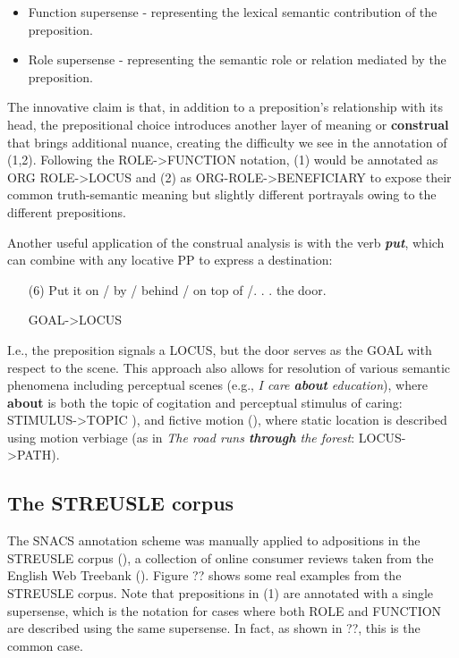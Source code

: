 \begin{itemize}
    \item Function supersense - representing the lexical semantic contribution of the preposition.
    \item Role supersense - representing the semantic role or relation mediated by the preposition.
\end{itemize}

The innovative claim is that, in addition to a preposition’s relationship with its head, the prepositional choice introduces another layer of meaning or \textbf{construal} that brings additional nuance, creating the difficulty we see in the annotation of (1,2). Following the ROLE->FUNCTION notation, (1) would be annotated as ORG ROLE->LOCUS and (2) as ORG-ROLE->BENEFICIARY to expose their common truth-semantic meaning but slightly different portrayals owing to the different prepositions.

Another useful application of the construal analysis is with the verb \textbf{\emph{put}}, which can combine with any locative PP to express a destination:

\begin{itemize}
    \item[(6)] Put it on / by / behind / on top of /. . . the door. 
    
    GOAL->LOCUS 
\end{itemize}


I.e., the preposition signals a LOCUS, but the door serves as the GOAL with respect to the scene. This approach also allows for resolution of various semantic phenomena including perceptual scenes (e.g., \emph{I care \textbf{about} education}), where \textbf{about} is both the topic of cogitation and perceptual stimulus of caring: STIMULUS->TOPIC ), and fictive motion (\cite{talmy-96}), where static location is described using motion verbiage (as in \emph{The road runs \textbf{through} the forest}: LOCUS->PATH). 

\subsection{The STREUSLE corpus}

The SNACS annotation scheme was manually applied to adpositions in the STREUSLE corpus (\cite{snacs}), a collection of online consumer reviews taken from the English Web Treebank (\cite{ewtb}). Figure ?? shows some real examples from the STREUSLE corpus. Note that prepositions in (1) are annotated with a single supersense, which is the notation for cases where both ROLE and FUNCTION are described using the same supersense. In fact, as shown in ??, this is the common case.

